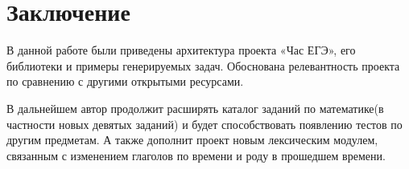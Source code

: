 \section*{Заключение}
В данной работе были приведены архитектура проекта «Час ЕГЭ», его библиотеки
и примеры генерируемых задач. Обоснована релевантность проекта по сравнению 
с другими открытыми ресурсами.

В дальнейшем автор продолжит расширять каталог
заданий по математике(в частности новых девятых заданий) и будет способствовать появлению тестов по другим предметам.
А также дополнит проект новым лексическим модулем, связанным с изменением
глаголов по времени и роду в прошедшем времени.

